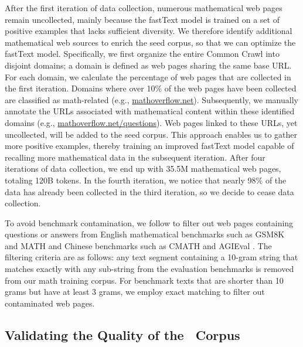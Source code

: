 After the first iteration of data collection, numerous mathematical web pages remain uncollected, mainly because the fastText model is trained on a set of positive examples that lacks sufficient diversity.
We therefore identify additional mathematical web sources to enrich the seed corpus, so that we can optimize the fastText model.
Specifically, we first organize the entire Common Crawl into disjoint domains;
a domain is defined as web pages sharing the same base URL.
For each domain, we calculate the percentage of web pages that are collected in the first iteration.
Domains where over 10\% of the web pages have been collected are classified as math-related (e.g., \url{mathoverflow.net}).
Subsequently, we manually annotate the URLs associated with mathematical content within these identified domains (e.g., \url{mathoverflow.net/questions}).
Web pages linked to these URLs, yet uncollected, will be added to the seed corpus.
This approach enables us to gather more positive examples, thereby training an improved fastText model capable of recalling more mathematical data in the subsequent iteration.
After four iterations of data collection, we end up with 35.5M mathematical web pages, totaling 120B tokens.
In the fourth iteration, we notice that nearly 98\% of the data has already been collected in the third iteration, so we decide to cease data collection.

To avoid benchmark contamination, we follow \cite{deepseek-coder} to filter out web pages containing questions or answers from English mathematical benchmarks such as GSM8K \citep{gsm8k} and MATH \citep{MATH} and Chinese benchmarks such as CMATH \citep{wei2023cmath} and AGIEval \citep{agieval}.
The filtering criteria are as follows: any text segment containing a 10-gram string that matches exactly with any sub-string from the evaluation benchmarks is removed from our math training corpus.
For benchmark texts that are shorter than 10 grams but have at least 3 grams, we employ exact matching to filter out contaminated web pages.

\subsection{Validating the Quality of the \spmath~Corpus}



